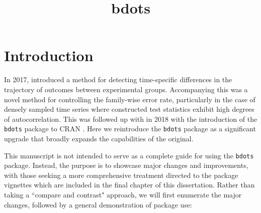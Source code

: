 \documentclass{article}
\title{bdots}
\date{}
\newcommand{\xt}{\texttt}%
\begin{document}


%




\section{Introduction}



In 2017,  \citet{oleson2017detecting} introduced a method for detecting time-specific differences in the trajectory of outcomes between experimental groups. Accompanying this was a novel method for controlling the family-wise error rate, particularly in the case of densely sampled time series where constructed test statistics exhibit high degrees of autocorrelation. This was followed up with in 2018 with the introduction of the \xt{bdots} package to CRAN \citep{seedorff2018bdots}. Here we reintroduce the \xt{bdots} package as a significant upgrade that broadly expands the capabilities of the original.
 

This manuscript is not intended to serve as a complete guide for using the \xt{bdots} package. Instead, the purpose is to showcase major changes and improvements, with those seeking a more comprehensive treatment directed to the package vignettes which are included in the final chapter of this dissertation. Rather than taking a ``compare and contrast" approach, we will first enumerate the major changes, followed by a general demonstration of package use:
\end{document}
